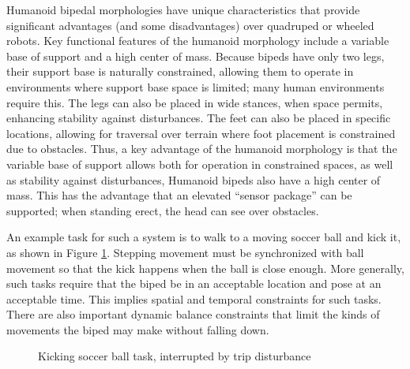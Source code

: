 \documentclass{llncs}
\begin{document}




Humanoid bipedal morphologies have unique characteristics that provide significant advantages (and some disadvantages) over quadruped or wheeled robots. 
Key functional features of the humanoid morphology include a variable base of support and a high center of mass.
Because bipeds have only two legs, their support base is naturally constrained, allowing them to operate in environments where support base space is limited; 
many human environments require this. 
The legs can also be placed in wide stances, when space permits, enhancing stability against disturbances.
The feet can also be placed in specific locations, allowing for traversal over terrain where foot placement is constrained due to obstacles.
Thus, a key advantage of the humanoid morphology is that the variable base of support allows both for operation in constrained spaces, 
as well as stability against disturbances, 
Humanoid bipeds also have a high center of mass.  
This has the advantage that an elevated ``sensor package'' can be supported; when standing erect, the head can see over obstacles. 

An example task for such a system is to walk to a moving soccer ball and kick it, as shown in Figure \ref{fig:Soccer1}.  
Stepping movement must be synchronized with ball movement so that the kick happens when the ball is close enough.  
More generally, such tasks require that the biped be in an acceptable location and pose at an acceptable time.  
This implies spatial and temporal constraints for such tasks.  
There are also important dynamic balance constraints that limit the kinds of movements the biped may make without falling down.

\begin{figure}[b]
\centering
 \vspace{-10pt}
\caption{Kicking soccer ball task, interrupted by trip disturbance}
\label{fig:Soccer1}
\end{figure}
\end{document}
